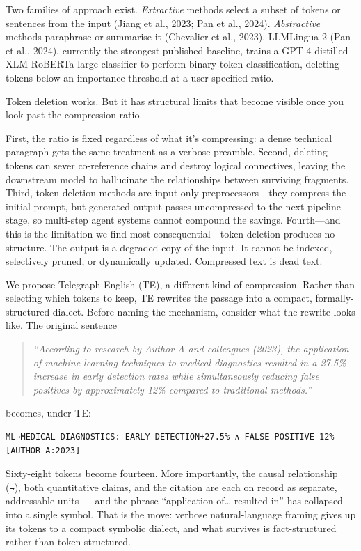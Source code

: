 \documentclass[
]{article}
\begin{document}
Two families of approach exist. \emph{Extractive} methods select a
subset of tokens or sentences from the input (Jiang et al., 2023; Pan et
al., 2024). \emph{Abstractive} methods paraphrase or summarise it
(Chevalier et al., 2023). LLMLingua-2 (Pan et al., 2024), currently the
strongest published baseline, trains a GPT-4-distilled XLM-RoBERTa-large
classifier to perform binary token classification, deleting tokens below
an importance threshold at a user-specified ratio.

Token deletion works. But it has structural limits that become visible
once you look past the compression ratio.

First, the ratio is fixed regardless of what it's compressing: a dense
technical paragraph gets the same treatment as a verbose preamble.
Second, deleting tokens can sever co-reference chains and destroy
logical connectives, leaving the downstream model to hallucinate the
relationships between surviving fragments. Third, token-deletion methods
are input-only preprocessors---they compress the initial prompt, but
generated output passes uncompressed to the next pipeline stage, so
multi-step agent systems cannot compound the savings. Fourth---and this
is the limitation we find most consequential---token deletion produces
no structure. The output is a degraded copy of the input. It cannot be
indexed, selectively pruned, or dynamically updated. Compressed text is
dead text.

We propose Telegraph English (TE), a different kind of compression.
Rather than selecting which tokens to keep, TE rewrites the passage into
a compact, formally-structured dialect. Before naming the mechanism,
consider what the rewrite looks like. The original sentence

\begin{quote}
\emph{``According to research by Author A and colleagues (2023), the
application of machine learning techniques to medical diagnostics
resulted in a 27.5\% increase in early detection rates while
simultaneously reducing false positives by approximately 12\% compared
to traditional methods.''}
\end{quote}

becomes, under TE:

\begin{verbatim}
ML→MEDICAL-DIAGNOSTICS: EARLY-DETECTION+27.5% ∧ FALSE-POSITIVE-12% [AUTHOR-A:2023]
\end{verbatim}

Sixty-eight tokens become fourteen. More importantly, the causal
relationship (\texttt{→}), both quantitative claims, and the citation
are each on record as separate, addressable units --- and the phrase
``application of\ldots{} resulted in'' has collapsed into a single
symbol. That is the move: verbose natural-language framing gives up its
tokens to a compact symbolic dialect, and what survives is
fact-structured rather than token-structured.
\end{document}
